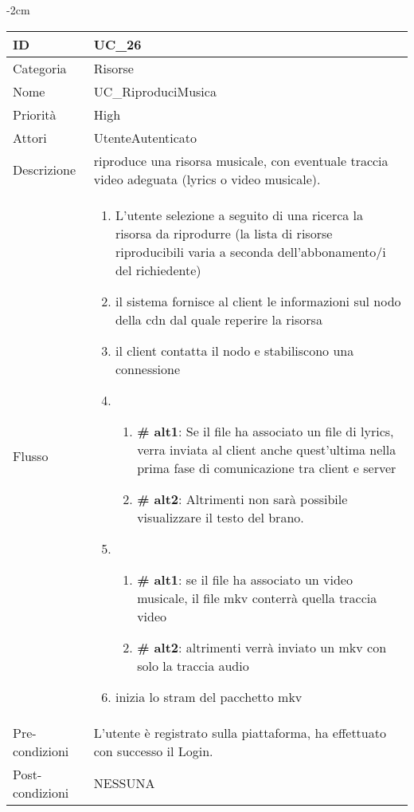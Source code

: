 \begin{center}
\begin{table}[bp]
    \centering
    \addtolength{\leftskip} {-2cm}
\begin{tabular}{ |p{2.6cm}|p{13cm}|  }
\hline
ID & UC\_26 \\\hline
Categoria & Risorse\\\hline
Nome & UC\_RiproduciMusica\\\hline
Priorità & High \\\hline
Attori &  UtenteAutenticato \\\hline
Descrizione & riproduce una risorsa musicale, con eventuale traccia video adeguata (lyrics o video musicale).\\\hline
Flusso &  	\vspace{-5mm} \begin{enumerate}
			\item L'utente selezione a seguito di una ricerca la risorsa da riprodurre (la lista di risorse riproducibili varia a seconda dell'abbonamento/i del richiedente)
			\item il sistema fornisce al client le informazioni sul nodo della cdn dal quale reperire la risorsa 
			\item il client contatta il nodo e stabiliscono una connessione
			\item \begin{enumerate}[label= ]
				\item \textbf{\# alt1}: Se il file ha associato un file di lyrics, verra inviata al client anche quest'ultima nella prima fase di comunicazione tra client e server
				\item \textbf{\# alt2}: Altrimenti non sarà possibile visualizzare il testo del brano.
			\end{enumerate}
			\item \begin{enumerate}[label= ]
				\item \textbf{\# alt1}: se il file ha associato un video musicale, il file mkv conterrà quella traccia video
				\item \textbf{\# alt2}: altrimenti verrà inviato un mkv con solo la traccia audio
			\end{enumerate}
			\item inizia lo stram del pacchetto mkv
			\end{enumerate}
			\\\hline
Pre-condizioni & L'utente è registrato sulla piattaforma, ha effettuato con successo il Login.\\\hline
Post-condizioni & NESSUNA\\\hline
\end{tabular}
\label{table_use_case:26}\newline
\end{table}


\end{center}
